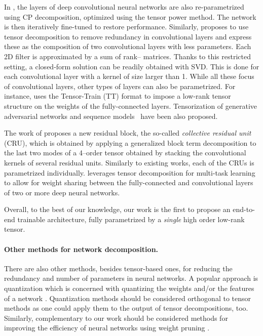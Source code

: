 \documentclass[10pt,twocolumn,letterpaper]{article}
\begin{document}
In \cite{astrid2017cp}, the layers of deep convolutional neural networks are also re-parametrized using CP decomposition, optimized using the tensor power method. The network is then iteratively fine-tuned to restore performance.
Similarly, \cite{tai2015convolutional} proposes to use tensor decomposition to remove redundancy in convolutional layers and express these as the composition of two convolutional layers with less parameters. Each 2D filter is approximated by a sum of rank-- matrices. Thanks to this restricted setting, a closed-form solution can be readily obtained with SVD. This is done for each convolutional layer with a kernel of size larger than 1.
While all these focus of convolutional layers, other types of layers can also be parametrized.
For instance, \cite{novikov2015tensorizing} uses the Tensor-Train (TT) format \cite{oseledets2011tensor} to impose a low-rank tensor structure on the weights of the fully-connected layers. Tensorization of generative adversarial networks \cite{tensor-gan} and sequence models~\cite{tensor-rnn} have  been also proposed.

The work of \cite{chen2017sharing} proposes a new residual block, the so-called \emph{collective residual unit} (CRU), which is obtained by applying a generalized block term decomposition to the last two modes of a 4\myth--order tensor obtained by stacking the convolutional kernels of several residual units. Similarly to existing works, each of the CRUs is parametrized individually. \cite{yang2016deep} leverages tensor decomposition for multi-task learning to allow for weight sharing between the fully-connected and convolutional layers of two or more deep neural networks.

Overall, to the best of our knowledge, our work is the first to propose an end-to-end trainable architecture, fully parametrized by a \emph{single} high order low-rank tensor.

\paragraph{Other methods for network decomposition.} 
There are also other methods, besides tensor-based ones, for reducing the redundancy and number of parameters in neural networks. A popular approach is quantization which is concerned with quantizing the weights and/or the features of a network \cite{tung2018clip,wu2016quantized,zhou2018explicit,tang2018quantized, courbariaux2015binaryconnect,rastegari2016xnor}. Quantization methods should be considered orthogonal to tensor methods as one could apply them to the output of tensor decompositions, too. Similarly, complementary to our work should be considered methods for improving the efficiency of neural networks using weight pruning \cite{li2017pruning, he2017channel}.
\end{document}
